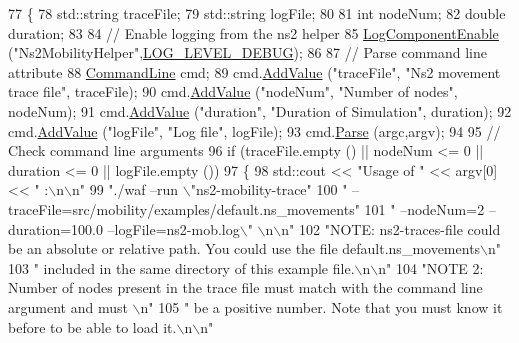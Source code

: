 \begin{DoxyCode}
77 \{
78   std::string traceFile;
79   std::string logFile;
80 
81   \textcolor{keywordtype}{int}    nodeNum;
82   \textcolor{keywordtype}{double} duration;
83 
84   \textcolor{comment}{// Enable logging from the ns2 helper}
85   \hyperlink{namespacens3_adc4ef4f00bb2f5f4edae67fc3bc27f20}{LogComponentEnable} (\textcolor{stringliteral}{"Ns2MobilityHelper"},\hyperlink{namespacens3_aa6464a4d69551a9cc968e17a65f39bdbabc85ae851e992c4d8577705c712061ef}{LOG\_LEVEL\_DEBUG});
86 
87   \textcolor{comment}{// Parse command line attribute}
88   \hyperlink{classns3_1_1CommandLine}{CommandLine} cmd;
89   cmd.\hyperlink{classns3_1_1CommandLine_addcfb546c7ad4c8bd0965654d55beb8e}{AddValue} (\textcolor{stringliteral}{"traceFile"}, \textcolor{stringliteral}{"Ns2 movement trace file"}, traceFile);
90   cmd.\hyperlink{classns3_1_1CommandLine_addcfb546c7ad4c8bd0965654d55beb8e}{AddValue} (\textcolor{stringliteral}{"nodeNum"}, \textcolor{stringliteral}{"Number of nodes"}, nodeNum);
91   cmd.\hyperlink{classns3_1_1CommandLine_addcfb546c7ad4c8bd0965654d55beb8e}{AddValue} (\textcolor{stringliteral}{"duration"}, \textcolor{stringliteral}{"Duration of Simulation"}, duration);
92   cmd.\hyperlink{classns3_1_1CommandLine_addcfb546c7ad4c8bd0965654d55beb8e}{AddValue} (\textcolor{stringliteral}{"logFile"}, \textcolor{stringliteral}{"Log file"}, logFile);
93   cmd.\hyperlink{classns3_1_1CommandLine_a5c10b85b3207e5ecb48d907966923156}{Parse} (argc,argv);
94 
95   \textcolor{comment}{// Check command line arguments}
96   \textcolor{keywordflow}{if} (traceFile.empty () || nodeNum <= 0 || duration <= 0 || logFile.empty ())
97     \{
98       std::cout << \textcolor{stringliteral}{"Usage of "} << argv[0] << \textcolor{stringliteral}{" :\(\backslash\)n\(\backslash\)n"}
99       \textcolor{stringliteral}{"./waf --run \(\backslash\)"ns2-mobility-trace"}
100       \textcolor{stringliteral}{" --traceFile=src/mobility/examples/default.ns\_movements"}
101       \textcolor{stringliteral}{" --nodeNum=2 --duration=100.0 --logFile=ns2-mob.log\(\backslash\)" \(\backslash\)n\(\backslash\)n"}
102       \textcolor{stringliteral}{"NOTE: ns2-traces-file could be an absolute or relative path. You could use the file
       default.ns\_movements\(\backslash\)n"}
103       \textcolor{stringliteral}{"      included in the same directory of this example file.\(\backslash\)n\(\backslash\)n"}
104       \textcolor{stringliteral}{"NOTE 2: Number of nodes present in the trace file must match with the command line argument and must
      \(\backslash\)n"}
105       \textcolor{stringliteral}{"        be a positive number. Note that you must know it before to be able to load it.\(\backslash\)n\(\backslash\)n"}

\end{DoxyCode}
